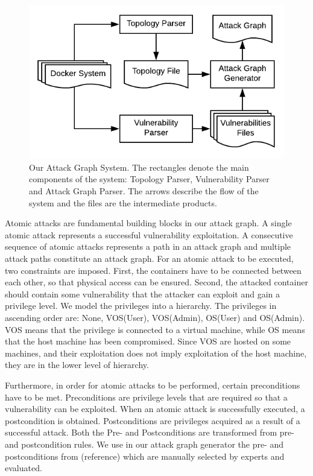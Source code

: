 \documentclass[letterpaper, 10 pt, conference]{ieeeconf}  %
\begin{document}
\begin{figure}
	\includegraphics[width=\textwidth]{AttackGraphSystem}
	\caption{Our Attack Graph System. The rectangles denote the main components of the system: Topology Parser, Vulnerability Parser and Attack Graph Parser. The arrows describe the flow of the system and the files are the intermediate products.}
	\label{AttackGraphSystem}
\end{figure}


Atomic attacks are fundamental building blocks in our attack graph. A single atomic attack represents a successful vulnerability exploitation. A consecutive sequence of atomic attacks represents a path in an attack graph and multiple attack paths constitute an attack graph. For an atomic attack to be executed, two constraints are imposed. First, the containers have to be connected between each other, so that physical access can be ensured. Second, the attacked container should contain some vulnerability that the attacker can exploit and gain a privilege level. We model the privileges into a hierarchy. The privileges in ascending order are: None, VOS(User), VOS(Admin), OS(User) and OS(Admin). VOS means that the privilege is connected to a virtual machine, while OS means that the host machine has been compromised. Since VOS are hosted on some machines, and their exploitation does not imply exploitation of the host machine, they are in the lower level of hierarchy.

Furthermore, in order for atomic attacks to be performed, certain preconditions have to be met. Preconditions are privilege levels that are required so that a vulnerability can be exploited. When an atomic attack is successfully executed, a postcondition is obtained. Postconditions are privileges acquired as a result of a successful attack. Both the Pre- and Postconditions are transformed from pre- and postcondition rules. We use in our attack graph generator the pre- and postconditions from (reference) which are manually selected by experts and evaluated.
\end{document}
